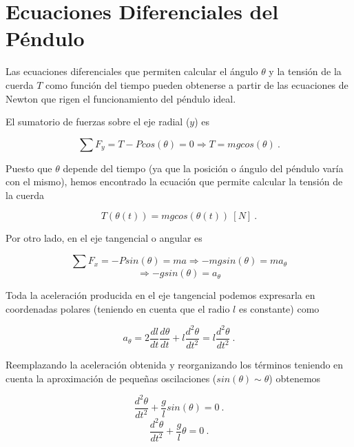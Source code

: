 \documentclass[journal]{IEEEtran}
\begin{document}
\section{Ecuaciones Diferenciales del Péndulo}

Las ecuaciones diferenciales que permiten calcular el ángulo $\theta$ y la tensión de la cuerda $T$ como función del tiempo pueden obtenerse a partir de las ecuaciones de Newton que rigen el funcionamiento del péndulo ideal.

El sumatorio de fuerzas sobre el eje radial ($y$) es

\begin{equation}
  \sum F_y = T - Pcos(\theta) = 0 \Rightarrow T = mgcos(\theta)~.
\end{equation}

Puesto que $\theta$ depende del tiempo (ya que la posición o ángulo del péndulo varía con el mismo), hemos encontrado la ecuación que permite calcular la tensión de la cuerda

\begin{equation}
  T(\theta(t)) = mgcos(\theta(t)) ~ [N]~.
\end{equation}

Por otro lado, en el eje tangencial o angular es

\begin{equation}
  \sum F_x = -Psin(\theta) = ma \Rightarrow -mgsin(\theta) = ma_\theta
\end{equation}
\begin{equation}
  \Rightarrow -gsin(\theta) = a_\theta
\end{equation}

Toda la aceleración producida en el eje tangencial podemos expresarla en coordenadas polares (teniendo en cuenta que el radio $l$ es constante) como

\begin{equation}
  a_\theta = 2\displaystyle\frac{dl}{dt}\displaystyle\frac{d\theta}{dt} + l\displaystyle\frac{d^2\theta}{dt^2} = l\displaystyle\frac{d^2\theta}{dt^2}~.
\end{equation}

Reemplazando la aceleración obtenida y reorganizando los términos teniendo en cuenta la aproximación de pequeñas oscilaciones ($sin(\theta) \sim \theta$) obtenemos

\begin{equation}
  \displaystyle\frac{d^2\theta}{dt^2} + \displaystyle\frac{g}{l}sin(\theta) = 0 ~.
\end{equation}
\begin{equation}
  \displaystyle\frac{d^2\theta}{dt^2} + \displaystyle\frac{g}{l}\theta = 0 ~.
\end{equation}
\end{document}
